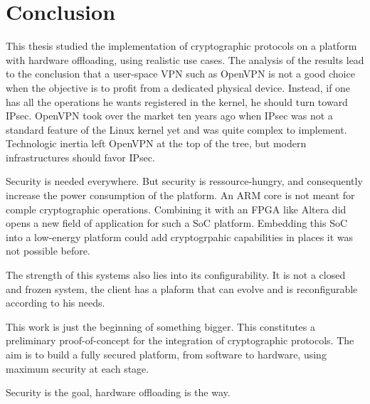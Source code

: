 \section{Conclusion}

This thesis studied the implementation of cryptographic protocols on a platform with hardware offloading, using realistic use cases.
The analysis of the results lead to the conclusion that a user-space VPN such as OpenVPN is not a good choice when the objective is to profit from a dedicated physical device.
Instead, if one has all the operations he wants registered in the kernel, he should turn toward IPsec.
OpenVPN took over the market ten years ago when IPsec was not a standard feature of the Linux kernel yet and was quite complex to implement.
Technologic inertia left OpenVPN at the top of the tree, but modern infrastructures should favor IPsec.\newline{}

Security is needed everywhere.
But security is ressource-hungry, and consequently increase the power consumption of the platform.
An ARM core is not meant for comple cryptographic operations.
Combining it with an FPGA like Altera did opens a new field of application for such a SoC platform.
Embedding this SoC into a low-energy platform could add cryptogrpahic capabilities in places it was not possible before.

The strength of this systems also lies into its configurability.
It is not a closed and frozen system, the client has a plaform that can evolve and is reconfigurable according to his needs.\newline{}

This work is just the beginning of something bigger.
This constitutes a preliminary proof-of-concept for the integration of cryptographic protocols.
The aim is to build a fully secured platform, from software to hardware, using maximum security at each stage.

\begin{center}
Security is the goal, hardware offloading is the way.
\end{center}